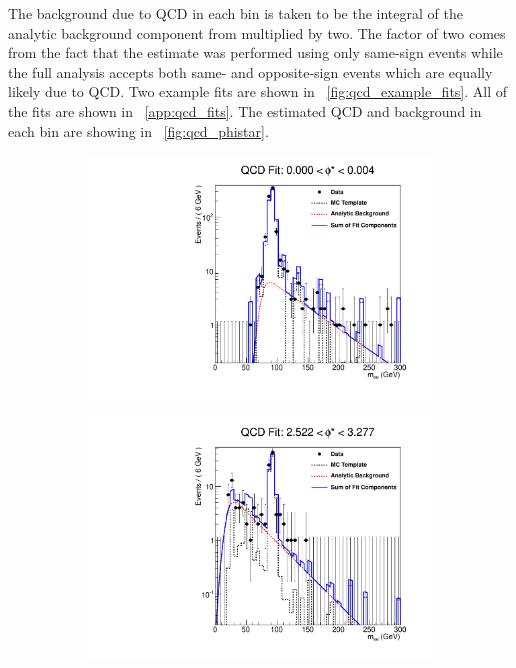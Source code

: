 The background due to QCD in each \phistar bin is taken to be the integral of
the analytic background component from \MassRange multiplied by two. The factor
of two comes from the fact that the estimate was performed using only same-sign
events while the full analysis accepts both same- and opposite-sign events
which are equally likely due to QCD. Two example fits are shown in
\FIG~\ref{fig:qcd_example_fits}. All of the fits are shown in
\APP~\ref{app:qcd_fits}. The estimated QCD and \wjets background in each
\phistar bin are showing in \FIG~\ref{fig:qcd_phistar}.

\begin{figure}[!htbp]
    \centering
    \begin{subfigure}[b]{\SideBySidePlotWidth}
        \includegraphics[width=\linewidth]{figures/qcd_fits/qcd_fit_plot_for_01.pdf}
        \caption{}
        \label{fig:qcd_fit_example_01}
    \end{subfigure}%
    \begin{subfigure}[b]{\SideBySidePlotWidth}
        \includegraphics[width=\linewidth]{figures/qcd_fits/qcd_fit_plot_for_34.pdf}

\end{subfigure}
\end{figure}

